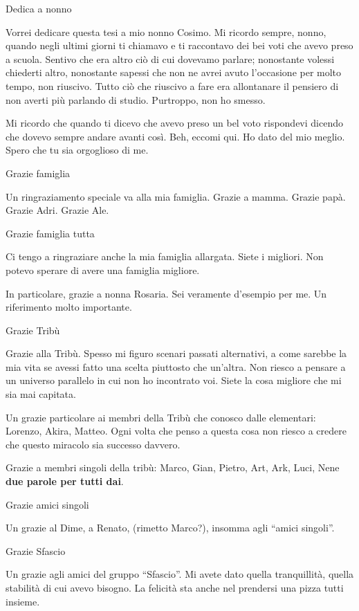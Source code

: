 \documentclass[a4paper,11pt]{article}
\begin{document}
	Dedica a nonno 
	
	{\color{red}Vorrei dedicare questa tesi a mio nonno Cosimo. Mi ricordo sempre, nonno, quando negli ultimi giorni ti chiamavo e ti raccontavo dei bei voti che avevo preso a scuola. Sentivo che era altro ciò di cui dovevamo parlare; nonostante volessi chiederti altro, nonostante sapessi che non ne avrei avuto l'occasione per molto tempo, non riuscivo. Tutto ciò che riuscivo a fare era allontanare il pensiero di non averti più parlando di studio. Purtroppo, non ho smesso.
	
	Mi ricordo che quando ti dicevo che avevo preso un bel voto rispondevi dicendo che dovevo sempre andare avanti così. Beh, eccomi qui. Ho dato del mio meglio. Spero che tu sia orgoglioso di me.}
	\medskip 
	
	Grazie famiglia
	
	{\color{red}Un ringraziamento speciale va alla mia famiglia.
	Grazie a mamma. Grazie papà. Grazie Adri. Grazie Ale.}
	\medskip 
	
	Grazie famiglia tutta
	
	{\color{red}Ci tengo a ringraziare anche la mia famiglia allargata. Siete i migliori. Non potevo sperare di avere una famiglia migliore.
	
	In particolare, grazie a nonna Rosaria. Sei veramente d'esempio per me. Un riferimento molto importante.}
	\medskip 
	
	Grazie Tribù
	
	{\color{red} Grazie alla Tribù. Spesso mi figuro scenari passati alternativi, a come sarebbe la mia vita se avessi fatto una scelta piuttosto che un'altra. Non riesco a pensare a un universo parallelo in cui non ho incontrato voi. Siete la cosa migliore che mi sia mai capitata.
		
	Un grazie particolare ai membri della Tribù che conosco dalle elementari: Lorenzo, Akira, Matteo. Ogni volta che penso a questa cosa non riesco a credere che questo miracolo sia successo davvero.
	
	Grazie a membri singoli della tribù: Marco, Gian, Pietro, Art, Ark, Luci, Nene \textbf{due parole per tutti dai}.}
	\medskip 
	
	Grazie amici singoli
	
	{\color{red} Un grazie al Dime, a Renato, (rimetto Marco?), insomma agli ``amici singoli''.}
	\medskip 
	
	Grazie Sfascio
	
	{\color{red} Un grazie agli amici del gruppo ``Sfascio''. Mi avete dato quella tranquillità, quella stabilità di cui avevo bisogno. La felicità sta anche nel prendersi una pizza tutti insieme.}
	\medskip 
	
\end{document}
